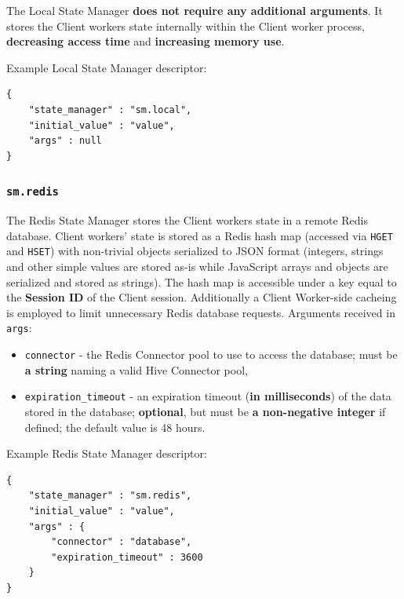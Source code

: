 \documentclass[a4paper]{article}
\begin{document}
The Local State Manager \textbf{does not require any additional arguments}. It stores the Client workers state internally within the Client worker process, \textbf{decreasing access time} and \textbf{increasing memory use}.

\noindent
Example Local State Manager descriptor:

\begin{verbatim}
{
    "state_manager" : "sm.local",
    "initial_value" : "value",
    "args" : null
}
\end{verbatim}
\subsubsection{\texttt{sm.redis}}
\label{sec-9-5-2}

The Redis State Manager stores the Client workers state in a remote Redis database. Client workers' state is stored as a Redis hash map (accessed via \texttt{HGET} and \texttt{HSET}) with non-trivial objects serialized to JSON format (integers, strings and other simple values are stored as-is while JavaScript arrays and objects are serialized and stored as strings). The hash map is accessible under a key equal to the \textbf{Session ID} of the Client session. Additionally a Client Worker-side cacheing is employed to limit unnecessary Redis database requests. Arguments received in \texttt{args}:


\begin{itemize}
\item \texttt{connector} - the Redis Connector pool to use to access the database; must be \textbf{a string} naming a valid Hive Connector pool,
\item \texttt{expiration\_timeout} - an expiration timeout (\textbf{in milliseconds}) of the data stored in the database; \textbf{optional}, but must be \textbf{a non-negative integer} if defined; the default value is 48 hours.
\end{itemize}

\noindent
Example Redis State Manager descriptor:

\begin{verbatim}
{
    "state_manager" : "sm.redis",
    "initial_value" : "value",
    "args" : {
        "connector" : "database",
        "expiration_timeout" : 3600
    }
}
\end{verbatim}
\end{document}
